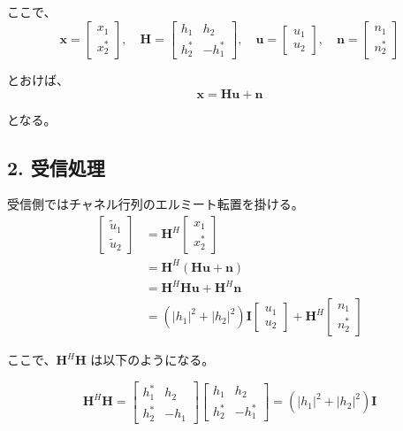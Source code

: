 \documentclass[uplatex,dvipdfmx,11pt,a4paper]{bxjsarticle}
\begin{document}
ここで、
\[
\mathbf{x}
=
\begin{bmatrix}
x_1 \\
x_2^*
\end{bmatrix},\quad
\mathbf{H}
=
\begin{bmatrix}
h_1 & h_2 \\
h_2^* & -h_1^*
\end{bmatrix},\quad
\mathbf{u}
=
\begin{bmatrix}
u_1 \\
u_2
\end{bmatrix},\quad
\mathbf{n}
=
\begin{bmatrix}
n_1 \\
n_2^*
\end{bmatrix}
\]

とおけば、
\[
\mathbf{x} = \mathbf{H}\mathbf{u} + \mathbf{n}
\]

となる。

\subsection*{2. 受信処理}

受信側ではチャネル行列のエルミート転置を掛ける。
\[
\begin{aligned}
\begin{bmatrix}
\tilde{u}_1 \\
\tilde{u}_2
\end{bmatrix}
&=
\mathbf{H}^{H}
\begin{bmatrix}
x_1 \\
x_2^*
\end{bmatrix} \\
&=
\mathbf{H}^{H}\left(\mathbf{H}\mathbf{u} + \mathbf{n}\right) \\
&=
\mathbf{H}^{H}\mathbf{H}\mathbf{u} + \mathbf{H}^{H}\mathbf{n} \\
&=
\left(\lvert h_1\rvert^2 + \lvert h_2\rvert^2\right)\mathbf{I}
\begin{bmatrix}
u_1 \\
u_2
\end{bmatrix}
+ \mathbf{H}^{H}
\begin{bmatrix}
n_1 \\
n_2^*
\end{bmatrix}
\end{aligned}
\]

ここで、$\mathbf{H}^{H}\mathbf{H}$ は以下のようになる。

\[
\mathbf{H}^{H}\mathbf{H}
=
\begin{bmatrix}
h_1^* & h_2 \\
h_2^* & -h_1
\end{bmatrix}
\begin{bmatrix}
h_1 & h_2 \\
h_2^* & -h_1^*
\end{bmatrix}
=
\left(\lvert h_1\rvert^2 + \lvert h_2\rvert^2\right)\mathbf{I}
\]
\end{document}
